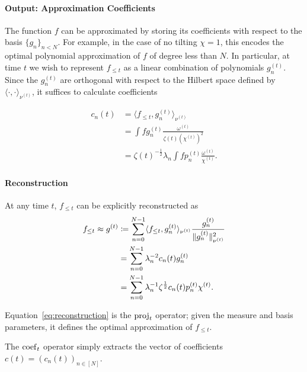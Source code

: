 \documentclass[../hippo.tex]{subfiles}
\begin{document}
\paragraph{Output: Approximation Coefficients}
The function $f$ can be approximated by storing its coefficients with respect to the basis $\{g_n\}_{n < N}$.
For example, in the case of no tilting $\chi = 1$, this encodes the optimal polynomial approximation of $f$ of degree less than $N$.
In particular, at time $t$ we wish to represent $f_{\leq t}$ as a linear combination of polynomials $g_n^{(t)}$.
Since the $g_n^{(t)}$ are orthogonal with respect to the Hilbert
space defined by $\langle \cdot, \cdot \rangle_{\nu^{(t)}}$, it suffices to calculate coefficients

\begin{equation}
  \label{eq:coefficient}
  \begin{aligned}
    c_n(t) &= \langle f_{\leq t}, g_n^{(t)} \rangle_{\nu^{(t)}}
    \\
    &= \int f g_n^{(t)} \frac{\omega^{(t)}}{\zeta(t) (\chi^{(t)})^2}
    \\
    &= \zeta(t)^{-\frac{1}{2}} \lambda_n \int f p_n^{(t)} \frac{\omega^{(t)}}{\chi^{(t)}}
    .
  \end{aligned}
\end{equation}

\paragraph{Reconstruction}
At any time $t$, $f_{\leq t}$ can be explicitly reconstructed as
\begin{equation}
  \label{eq:reconstruction}
  \begin{aligned}
    f_{\leq t} \approx g^{(t)}
    &\coloneqq \sum_{n=0}^{N-1} \langle f_{\leq t}, g_n^{(t)} \rangle_{\nu^{(t)}} \frac{g_n^{(t)}}{\| g_n^{(t)} \|_{\nu^{(t)}}^2}
    \\
    &= \sum_{n=0}^{N-1} \lambda_n^{-2} c_n(t) g_n^{(t)}
    \\
    &= \sum_{n=0}^{N-1} \lambda_n^{-1} \zeta^{\frac{1}{2}} c_n(t) p_n^{(t)} \chi^{(t)}
    .
  \end{aligned}
\end{equation}


Equation~\eqref{eq:reconstruction} is the $\operatorname{proj}_t$ operator;
given the measure and basis parameters, it defines the optimal approximation of $f_{\leq t}$.


The $\operatorname{coef}_t$ operator simply extracts the vector of coefficients $c(t) = (c_n(t))_{n \in [N]}$.
\end{document}
